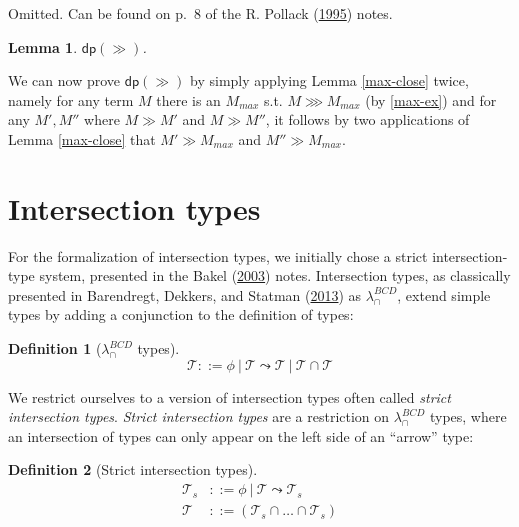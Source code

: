 \documentclass[a4paper, 12pt, twoside]{style/ociamthesis}
\makeatletter
\theoremstyle{plain}
\newtheorem{Lemma}{Lemma}[chapter]
\theoremstyle{definition}
\newtheorem{Definition}{Definition}[chapter]
\theoremstyle{remark}
\renewenvironment{proof}[1][\proofname]{\par
  \vspace{-\topsep}%
  \pushQED{\qed}%
  \normalfont
  \topsep0pt \partopsep0pt %
  \trivlist
  \item[\hskip\labelsep
        \itshape
    #1\@addpunct{.}]\ignorespaces
}{%
  \popQED\endtrivlist\@endpefalse
  \addvspace{6pt plus 6pt} %
}
\newcommand{\dip}{\textsf{dp}}
\makeatother
\begin{document}
\begin{proof}

Omitted. Can be found on p.~8 of the R. Pollack
(\protect\hyperlink{ref-pollack95}{1995}) notes.

\end{proof}

\begin{Lemma}

\(\dip(\gg)\).

\end{Lemma}

\begin{proof}

We can now prove \(\dip(\gg)\) by simply applying Lemma \ref{max-close}
twice, namely for any term \(M\) there is an \(M_{max}\) s.t.
\(M \ggg M_{max}\) (by \ref{max-ex}) and for any \(M', M''\) where
\(M \gg M'\) and \(M \gg M''\), it follows by two applications of Lemma
\ref{max-close} that \(M' \gg M_{max}\) and \(M'' \gg M_{max}\).

\end{proof}

\newpage

\section{Intersection types}\label{intersection-types}

For the formalization of intersection types, we initially chose a strict
intersection-type system, presented in the Bakel
(\protect\hyperlink{ref-bakel}{2003}) notes. Intersection types, as
classically presented in Barendregt, Dekkers, and Statman
(\protect\hyperlink{ref-barendregt13}{2013}) as \(\lambda_\cap^{BCD}\),
extend simple types by adding a conjunction to the definition of types:

\begin{Definition}[$\lambda_\cap^{BCD}$ types]

\[\mathcal{T} ::= \phi\ |\ \mathcal{T} \leadsto \mathcal{T}\ |\ \mathcal{T} \cap \mathcal{T}\]

\end{Definition}

We restrict ourselves to a version of intersection types often called
\emph{strict intersection types}. \emph{Strict intersection types} are a
restriction on \(\lambda_\cap^{BCD}\) types, where an intersection of
types can only appear on the left side of an ``arrow'' type:

\begin{Definition}[Strict intersection types]

\begin{align*} 
\mathcal{T}_s &::= \phi\ |\ \mathcal{T} \leadsto \mathcal{T}_s \\ 
\mathcal{T} &::= (\mathcal{T}_s \cap\hdots\cap \mathcal{T}_s)
\end{align*}

\end{Definition}
\end{document}
